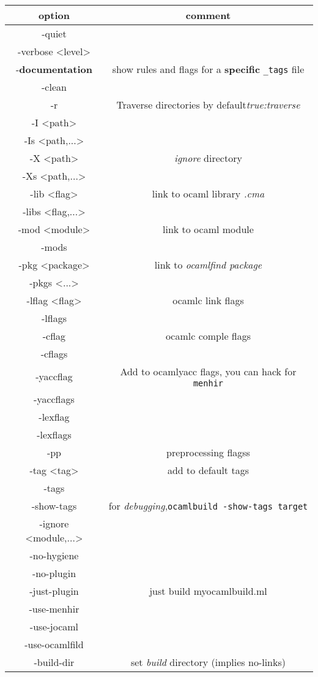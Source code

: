 \begin{spacing}{0.5}\small
\begin{tabular}{|c|c|}
\hline
option & comment \\
\hline
-quiet & \\
-verbose <level> & \\
-\textbf{documentation} & show rules and flags for a \textbf{specific} \verb|_tags| file
\\
-clean & \\
-r & Traverse directories by default\textit{true:traverse} \\
-I <path> & \\
-Is <path,...> & \\
-X <path> & \textit{ignore} directory \\
-Xs <path,...> & \\
-lib <flag> & link to ocaml library \textit{.cma} \\
-libs <flag,...> & \\
-mod <module> & link to ocaml module \\
-mods & \\
-pkg <package> & link to \textit{ocamlfind package} \\
-pkgs <...> & \\
-lflag  <flag> & ocamlc link flags \\
-lflags & \\
-cflag & ocamlc comple flags \\
-cflags & \\
-yaccflag &  Add to ocamlyacc flags, you can hack for \verb|menhir| \\
-yaccflags & \\
-lexflag & \\
-lexflags & \\
-pp & preprocessing flagss\\
-tag <tag> & add to default tags \\
-tags & \\
-show-tags & for \textit{debugging},\verb|ocamlbuild -show-tags target| \\
-ignore <module,...> & \\
-no-hygiene & \\
-no-plugin & \\
-just-plugin & just build myocamlbuild.ml \\
-use-menhir & \\
-use-jocaml & \\
-use-ocamlfild & \\
-build-dir & set \textit{build} directory (implies no-links)\\

\end{tabular}
\end{spacing}

